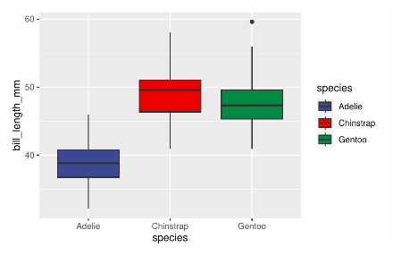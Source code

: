 \documentclass[
  letterpaper,
  DIV=11,
  numbers=noendperiod]{scrartcl}
\begin{document}
\begin{figure}[H]

{\centering \includegraphics{colors_files/figure-pdf/unnamed-chunk-6-1.pdf}

}

\end{figure}
\end{document}
